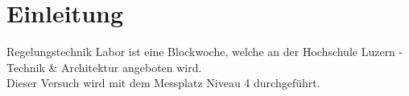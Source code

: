 \section*{Einleitung}
Regelungstechnik Labor ist eine Blockwoche, welche an der Hochschule Luzern - 
Technik \& Architektur angeboten wird. \\
Dieser Versuch wird mit dem Messplatz Niveau 4 durchgeführt. 

